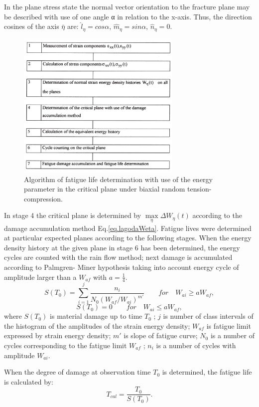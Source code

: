 In the plane stress state the normal vector orientation
to the fracture plane may be described with use of one
angle α in relation to the x-axis. Thus, the direction
cosines of the axis $\bar{\eta}$ are:
$\hat{l}_\eta=cos\alpha$, $\hat{m}_\eta=sin\alpha$, $\hat{n}_\eta=0$.
\begin{figure}[h!]
	\centering
	\includegraphics[width=0.7\textwidth]{figures//algorithm.png} 
	\caption{Algorithm of fatigue life determination with use of the energy parameter in the critical plane under biaxial random tension-compression.}
	\label{fig.algorithm}
\end{figure}
In stage 4 the critical plane is determined by $\max \limits_{\eta}\Delta W_{\eta}(t)$ according to
the damage accumulation method Eq.\ref{eq.lagodaWeta}. Fatigue lives
were determined at particular expected planes according
to the following stages. When the energy density history
at the given plane in stage 6 has been determined, the
energy cycles are counted with the rain flow method;
next damage is accumulated according to Palmgren-
Miner hypothesis taking into account energy
cycle of amplitude larger than a $W_{af}$ with $a=\frac{1}{4}$.
$$S(T_0)=\sum_{i=1}^{j}\dfrac{n_i}{N_0(W_{af}/W_{ai})^{m'}} \qquad for \quad W_{ai} \geqslant aW_{af},$$
$$S(T_0)=0 \qquad for \quad W_{ai} \leqslant aW_{af},$$
where $S(T_0)$ is material damage up to time $T_0$ ; $j$ is number of class intervals of the histogram of the amplitudes
of the strain energy density; $W_{af}$ is fatigue limit
expressed by strain energy density;  $m'$ is slope of fatigue curve; $N_0$ is a number of cycles corresponding to the fatigue
limit $W_{af}$ ; $n_i$ is a number of cycles with amplitude $W_{ai}$.

When the degree of damage at observation time $T_0$ is
determined, the fatigue life is calculated by:
$$T_{cal}=\dfrac{T_0}{S(T_0)}.$$

